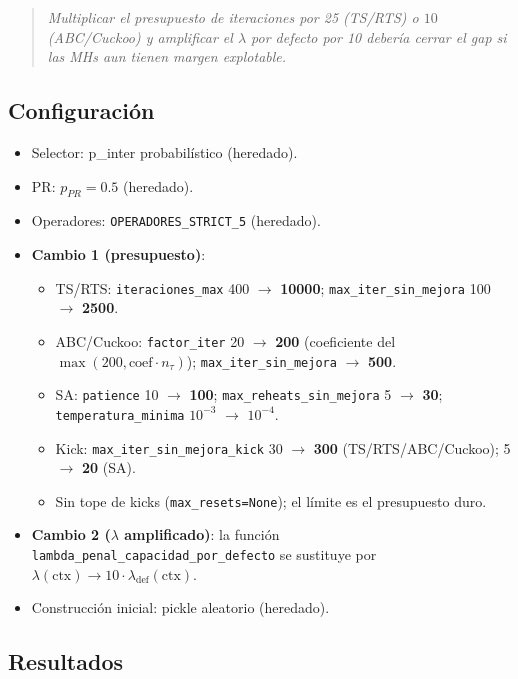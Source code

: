 \documentclass[11pt,a4paper]{article}
\theoremstyle{definition}
\theoremstyle{remark}
\begin{document}
\begin{quote}
\textit{Multiplicar el presupuesto de iteraciones por 25 (TS/RTS) o
$10$ (ABC/Cuckoo) y amplificar el $\lambda$ por defecto por 10
debería cerrar el gap si las MHs aun tienen margen explotable.}
\end{quote}

\subsection{Configuración}

\begin{itemize}
\item Selector: p\_inter probabilístico (heredado).
\item PR: $p_{PR} = 0.5$ (heredado).
\item Operadores: \texttt{OPERADORES\_STRICT\_5} (heredado).
\item \textbf{Cambio 1 (presupuesto)}:
  \begin{itemize}
  \item TS/RTS: \texttt{iteraciones\_max} 400 $\to$ \textbf{10000};
    \texttt{max\_iter\_sin\_mejora} 100 $\to$ \textbf{2500}.
  \item ABC/Cuckoo: \texttt{factor\_iter} 20 $\to$ \textbf{200}
    (coeficiente del $\max(200, \text{coef} \cdot n_\tau)$);
    \texttt{max\_iter\_sin\_mejora} $\to$ \textbf{500}.
  \item SA: \texttt{patience} 10 $\to$ \textbf{100};
    \texttt{max\_reheats\_sin\_mejora} 5 $\to$ \textbf{30};
    \texttt{temperatura\_minima} $10^{-3}$ $\to$ \textbf{$10^{-4}$}.
  \item Kick: \texttt{max\_iter\_sin\_mejora\_kick} 30 $\to$
    \textbf{300} (TS/RTS/ABC/Cuckoo); 5 $\to$ \textbf{20} (SA).
  \item Sin tope de kicks (\texttt{max\_resets=None}); el límite es el
    presupuesto duro.
  \end{itemize}
\item \textbf{Cambio 2 ($\lambda$ amplificado)}: la función
  \texttt{lambda\_penal\_capacidad\_por\_defecto} se sustituye por
  $\lambda(\text{ctx}) \to 10 \cdot \lambda_{\text{def}}(\text{ctx})$.
\item Construcción inicial: pickle aleatorio (heredado).
\end{itemize}

\subsection{Resultados}
\end{document}
